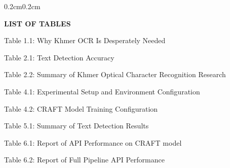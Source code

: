 \begin{adjustwidth}{0.2cm}{0.2cm}

    \begin{center}
        {\englishfont\fontsize{14pt}{21pt}\selectfont \textbf{LIST OF TABLES} \par}
    \end{center}
    \label{lot}

    \vspace{0.1cm}
    \setlength{\parindent}{0pt}
    \vspace{0.3cm}
    
    {\large Table 1.1: Why Khmer OCR Is Desperately Needed\dotfill\pageref{sec:textbook}\hspace{0.1cm}\par}
    
    {\large Table 2.1: Text Detection Accuracy\dotfill\pageref{tab:text_detection_accuracy}\hspace{0.1cm}\par}
    {\large Table 2.2: Summary of Khmer Optical Character Recognition Research\dotfill\pageref{tab:khmer_ocr_summary}\hspace{0.1cm}\par}
    
    {\large Table 4.1: Experimental Setup and Environment Configuration\dotfill\pageref{tab:experimental_setup}\hspace{0.1cm}\par}
    {\large Table 4.2: CRAFT Model Training Configuration\dotfill\pageref{tab:craft-training-config}\hspace{0.1cm}\par}
    
    {\large Table 5.1: Summary of Text Detection Results\dotfill\pageref{tab:craft_experimental_result}\hspace{0.1cm}\par}
    
    {\large Table 6.1: Report of API Performance on CRAFT model\dotfill\pageref{tab:api_craft_performance_evaluation}\hspace{0.1cm}\par}
    {\large Table 6.2: Report of Full Pipeline API Performance\dotfill\pageref{tab:api_performance_evaluation}\hspace{0.1cm}\par}

\end{adjustwidth}